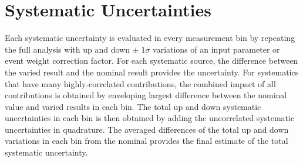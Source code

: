 \section{Systematic Uncertainties}
\label{Systematic_Uncertainties}
Each systematic uncertainty is evaluated in every measurement bin by repeating the full analysis with up and down $\pm \; 1 \sigma$ variations of an input parameter or event weight correction factor.
For each systematic source, the difference between the varied result and the nominal result provides the uncertainty.
For systematics that have many highly-correlated contributions, the combined impact of all contributions is obtained by enveloping largest difference between the nominal value and varied results in each bin.
The total up and down systematic uncertainties in each bin is then obtained by adding the uncorrelated systematic uncertainties in quadrature.
The averaged differences of the total up and down variations in each bin from the nominal provides the final estimate of the total systematic uncertainty.


